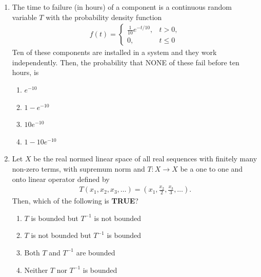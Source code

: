 \documentclass[journal]{IEEEtran}
\numberwithin{equation}{enumi}
\numberwithin{figure}{enumi}
\begin{document}
\begin{enumerate}
\item The time to failure (in hours) of a component is a continuous random variable $T$ with the probability density function
    \begin{align*}
        f(t) = 
        \begin{cases}
            \frac{1}{10} e^{-t/10}, & t > 0, \\
            0, & t \leq 0
        \end{cases}
     \end{align*}
    Ten of these components are installed in a system and they work independently. Then, the probability that NONE of these fail before ten hours, is
\hfill{}
\begin{multicols}{4}
\begin{enumerate}
\item  $e^{-10}$
\item  $1 - e^{-10}$
\item  $10 e^{-10}$
\item  $1 - 10 e^{-10}$
\end{enumerate}
\end{multicols}

     
    
    \item Let $X$ be the real normed linear space of all real sequences with finitely many non-zero terms, with supremum norm and $T : X \to X$ be a one to one and onto linear operator defined by
    \begin{align*}
        T(x_1, x_2, x_3, \ldots) = (x_1, \frac{x_2}{2}, \frac{x_3}{3}, \ldots).
     \end{align*}
    Then, which of the following is \textbf{TRUE}?
    \hfill{}
\begin{multicols}{2}
\begin{enumerate}
\item  $T$ is bounded but $T^{-1}$ is not bounded
\item  $T$ is not bounded but $T^{-1}$ is bounded
\item  Both $T$ and $T^{-1}$ are bounded
\item  Neither $T$ nor $T^{-1}$ is bounded
\end{enumerate}
\end{multicols}

    
    

\end{enumerate}
\end{document}
